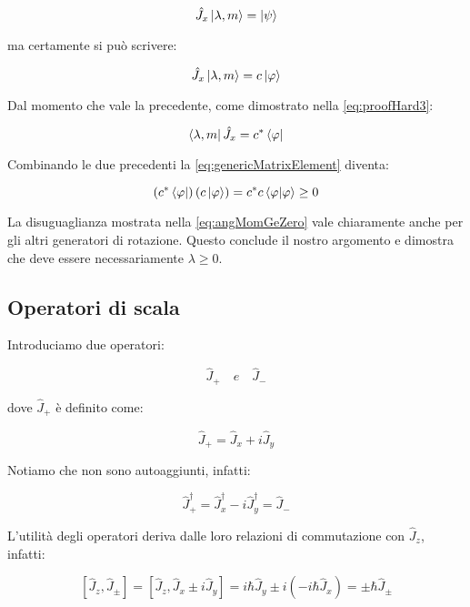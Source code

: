 	\begin{equation}
		\hat{J}_x \ket{\lambda, m} = \ket{\psi}
	\end{equation}

ma certamente si pu\`o scrivere:

	\begin{equation}
		\hat{J}_x \ket{\lambda, m} = c \ket{\varphi}
	\end{equation}

Dal momento che vale la precedente, come dimostrato nella \eqref{eq:proofHard3}:

	\begin{equation}
		\bra{\lambda, m} \hat{J}_x = c^* \bra{\varphi}
	\end{equation}

Combinando le due precedenti la \eqref{eq:genericMatrixElement} diventa:

	\begin{equation} \label{eq:angMomGeZero}
		\left ( c^* \bra{\varphi} \right ) \left ( c \ket{\varphi} \right ) = c^*c \braket{\varphi}{\varphi} \ge 0
	\end{equation}

La disuguaglianza mostrata nella \eqref{eq:angMomGeZero} vale chiaramente anche per gli altri generatori di rotazione. Questo conclude il nostro argomento e dimostra che deve essere necessariamente $\lambda \ge 0$.

\subsection{Operatori di scala}

Introduciamo due operatori:

	\[
		\hat{J}_+ \quad e \quad \hat{J}_-
	\]

dove $\hat{J}_+$ \`e definito come:

	\[
		\hat{J}_+ = \hat{J}_x + i \hat{J}_y
	\]

Notiamo che non sono autoaggiunti, infatti:

	\[
		\hat{J}^\dagger_+ = \hat{J}^\dagger_x - i \hat{J}^\dagger_y = \hat{J}_-
	\]

L'utilit\`a degli operatori deriva dalle loro relazioni di commutazione con $\hat{J}_z$, infatti:

	\begin{equation}
		\left [ \hat{J}_z, \hat{J}_\pm \right ] = \left [ \hat{J}_z, \hat{J}_x \pm i \hat{J}_y \right ] = i \hbar \hat{J}_y \pm
			i ( -i \hbar \hat{J}_x ) = \pm \hbar \hat{J}_\pm
	\end{equation}

